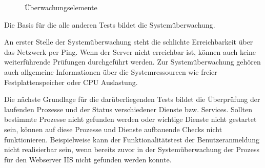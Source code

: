 \begin{figure}[ht]
	\centering
		\caption{Überwachungselemente}
		\label{moniele}
\end{figure}


Die Basis für die alle anderen Tests bildet die Systemüberwachung.

An erster Stelle der Systemüberwachung steht die schlichte Erreichbarkeit über das Netzwerk per Ping.
Wenn der Server nicht erreichbar ist, können auch keine weiterführende Prüfungen durchgeführt werden.
Zur Systemüberwachung gehören auch allgemeine Informationen über die Systemressourcen wie freier Festplattenspeicher oder CPU Auslastung.

Die nächste Grundlage für die darüberliegenden Tests bildet die Überprüfung der laufenden Prozesse und der Status verschiedener Dienste bzw. Services.
Sollten bestimmte Prozesse nicht gefunden werden oder wichtige Dienste nicht gestartet sein, können auf diese Prozesse und Dienste aufbauende Checks nicht funktionieren.
Beispielweise kann der Funktionalitätstest der Benutzeranmeldung nicht realisierbar sein, wenn bereits zuvor in der Systemüberwachung der Prozess für den Webserver \gls{IIS} nicht gefunden werden konnte.













